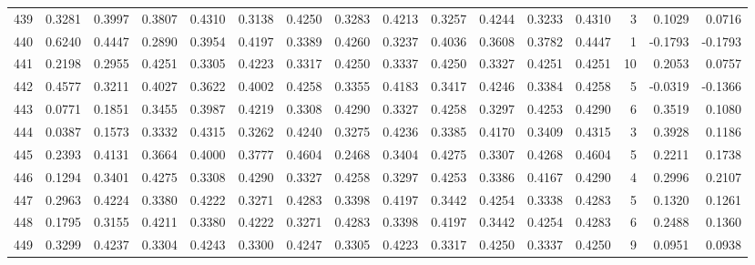 \begin{tabular}{lrrrrrrrrrrrrrrr}
439 &      0.3281 &  0.3997 &  0.3807 &  0.4310 &  0.3138 &  0.4250 &  0.3283 &  0.4213 &  0.3257 &  0.4244 &   0.3233 &     0.4310 &      3 &                    0.1029 &                     0.0716 \\
440 &      0.6240 &  0.4447 &  0.2890 &  0.3954 &  0.4197 &  0.3389 &  0.4260 &  0.3237 &  0.4036 &  0.3608 &   0.3782 &     0.4447 &      1 &                   -0.1793 &                    -0.1793 \\
441 &      0.2198 &  0.2955 &  0.4251 &  0.3305 &  0.4223 &  0.3317 &  0.4250 &  0.3337 &  0.4250 &  0.3327 &   0.4251 &     0.4251 &     10 &                    0.2053 &                     0.0757 \\
442 &      0.4577 &  0.3211 &  0.4027 &  0.3622 &  0.4002 &  0.4258 &  0.3355 &  0.4183 &  0.3417 &  0.4246 &   0.3384 &     0.4258 &      5 &                   -0.0319 &                    -0.1366 \\
443 &      0.0771 &  0.1851 &  0.3455 &  0.3987 &  0.4219 &  0.3308 &  0.4290 &  0.3327 &  0.4258 &  0.3297 &   0.4253 &     0.4290 &      6 &                    0.3519 &                     0.1080 \\
444 &      0.0387 &  0.1573 &  0.3332 &  0.4315 &  0.3262 &  0.4240 &  0.3275 &  0.4236 &  0.3385 &  0.4170 &   0.3409 &     0.4315 &      3 &                    0.3928 &                     0.1186 \\
445 &      0.2393 &  0.4131 &  0.3664 &  0.4000 &  0.3777 &  0.4604 &  0.2468 &  0.3404 &  0.4275 &  0.3307 &   0.4268 &     0.4604 &      5 &                    0.2211 &                     0.1738 \\
446 &      0.1294 &  0.3401 &  0.4275 &  0.3308 &  0.4290 &  0.3327 &  0.4258 &  0.3297 &  0.4253 &  0.3386 &   0.4167 &     0.4290 &      4 &                    0.2996 &                     0.2107 \\
447 &      0.2963 &  0.4224 &  0.3380 &  0.4222 &  0.3271 &  0.4283 &  0.3398 &  0.4197 &  0.3442 &  0.4254 &   0.3338 &     0.4283 &      5 &                    0.1320 &                     0.1261 \\
448 &      0.1795 &  0.3155 &  0.4211 &  0.3380 &  0.4222 &  0.3271 &  0.4283 &  0.3398 &  0.4197 &  0.3442 &   0.4254 &     0.4283 &      6 &                    0.2488 &                     0.1360 \\
449 &      0.3299 &  0.4237 &  0.3304 &  0.4243 &  0.3300 &  0.4247 &  0.3305 &  0.4223 &  0.3317 &  0.4250 &   0.3337 &     0.4250 &      9 &                    0.0951 &                     0.0938 \\

\end{tabular}
